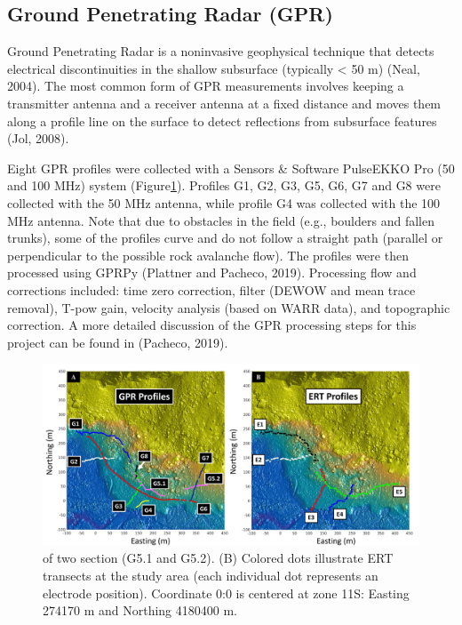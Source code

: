 \documentclass[5p]{elsarticle}
\begin{document}
										\subsection{Ground Penetrating Radar (GPR)}
										
Ground Penetrating Radar is a noninvasive geophysical technique that detects electrical discontinuities in the shallow subsurface (typically < 50 m) (Neal, 2004). The most common form of GPR measurements involves keeping a transmitter antenna and a receiver antenna at a fixed distance and moves them along a profile line on the surface to detect reflections from subsurface features (Jol, 2008). 

Eight GPR profiles were collected with a Sensors \& Software PulseEKKO Pro (50 and 100 MHz) system (Figure\ref{GPR profile 7}). Profiles G1, G2, G3, G5, G6, G7 and G8 were collected with the 50 MHz antenna, while profile G4 was collected with the 100 MHz antenna. Note that due to obstacles in the field (e.g., boulders and fallen trunks), some of the profiles curve and do not follow a straight path (parallel or perpendicular to the possible rock avalanche flow). The profiles were then processed using GPRPy (Plattner and Pacheco, 2019). Processing flow and corrections included: time zero correction, filter (DEWOW and mean trace removal), T-pow gain, velocity analysis (based on WARR data), and topographic correction. A more detailed discussion of the GPR processing steps for this project can be found in (Pacheco, 2019).

											\begin{figure}[h]

	\includegraphics[width=\textwidth]{Figures/GPR_ERT_Map.pdf}
		\caption{of two section (G5.1 and G5.2). (B) Colored dots illustrate ERT transects at the study area (each individual dot represents an electrode position). Coordinate 0:0 is centered at zone 11S: Easting 274170 m and Northing 4180400 m.  \label{GPR profile 7}}


											\end{figure}										
											
\end{document}
